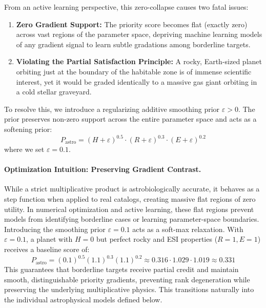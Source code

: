 \documentclass[11pt,a4paper]{article}
\begin{document}
From an active learning perspective, this zero-collapse causes two fatal issues:
\begin{enumerate}
    \item \textbf{Zero Gradient Support:} The priority score becomes flat (exactly zero) across vast regions of the parameter space, depriving machine learning models of any gradient signal to learn subtle gradations among borderline targets.
    \item \textbf{Violating the Partial Satisfaction Principle:} A rocky, Earth-sized planet orbiting just at the boundary of the habitable zone is of immense scientific interest, yet it would be graded identically to a massive gas giant orbiting in a cold stellar graveyard.
\end{enumerate}

To resolve this, we introduce a regularizing additive smoothing prior $\varepsilon > 0$. The prior preserves non-zero support across the entire parameter space and acts as a softening prior:
\begin{equation}
P_{\text{astro}} = (H + \varepsilon)^{0.5} \cdot (R + \varepsilon)^{0.3} \cdot (E + \varepsilon)^{0.2}
\label{eq:smoothed_mult}
\end{equation}
where we set $\varepsilon = 0.1$.

\paragraph{Optimization Intuition: Preserving Gradient Contrast.} 
While a strict multiplicative product is astrobiologically accurate, it behaves as a step function when applied to real catalogs, creating massive flat regions of zero utility. In numerical optimization and active learning, these flat regions prevent models from identifying borderline cases or learning parameter-space boundaries. Introducing the smoothing prior $\varepsilon = 0.1$ acts as a soft-max relaxation. With $\varepsilon = 0.1$, a planet with $H=0$ but perfect rocky and ESI properties ($R=1, E=1$) receives a baseline score of:
\begin{equation}
P_{\text{astro}} = (0.1)^{0.5} (1.1)^{0.3} (1.1)^{0.2} \approx 0.316 \cdot 1.029 \cdot 1.019 \approx 0.331
\label{eq:smoothed_calc}
\end{equation}
This guarantees that borderline targets receive partial credit and maintain smooth, distinguishable priority gradients, preventing rank degeneration while preserving the underlying multiplicative physics. This transitions naturally into the individual astrophysical models defined below.
\end{document}
